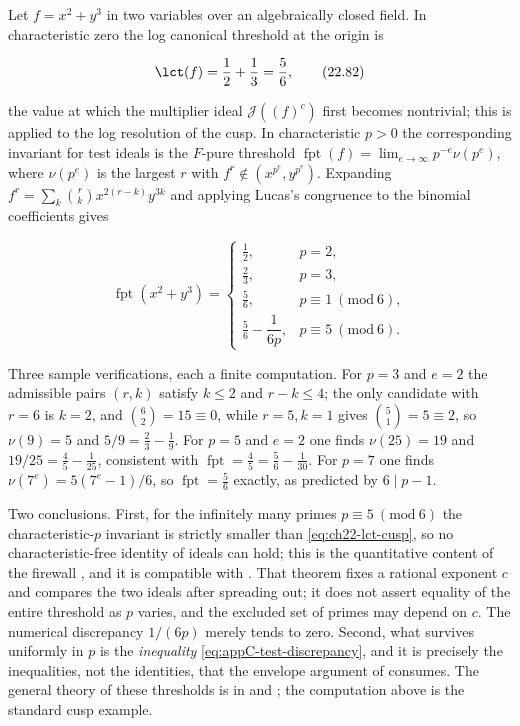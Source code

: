 \begin{example}
\label{ex:ch22-fpt-cusp}
Let $f=x^2+y^3$ in two variables over an algebraically closed field.  In
characteristic zero the log canonical threshold at the origin is

\[
 \lct(f)=\frac12+\frac13=\frac56 ,
\tag{22.82}\label{eq:ch22-lct-cusp}
\]

the value at which the multiplier ideal
$\mathcal J((f)^c)$ first becomes nontrivial; this is
 applied to the log resolution of the cusp.  In
characteristic $p>0$ the corresponding invariant for test ideals is the
$F$-pure threshold
$\operatorname{fpt}(f)=\lim_{e\to\infty}p^{-e}\nu(p^e)$, where
$\nu(p^e)$ is the largest $r$ with
$f^r\notin(x^{p^e},y^{p^e})$.  Expanding
$f^r=\sum_k\binom rkx^{2(r-k)}y^{3k}$ and applying Lucas's congruence to
the binomial coefficients gives

\[
 \operatorname{fpt}(x^2+y^3)=
 \begin{cases}
  \tfrac12,&p=2,\\[1mm]
  \tfrac23,&p=3,\\[1mm]
  \tfrac56,&p\equiv1\ (\mathrm{mod}\ 6),\\[1mm]
  \tfrac56-\dfrac1{6p},&p\equiv5\ (\mathrm{mod}\ 6).
 \end{cases}
\tag{22.83}\label{eq:ch22-fpt-cusp}
\]

Three sample verifications, each a finite computation.  For $p=3$ and
$e=2$ the admissible pairs $(r,k)$ satisfy $k\leq2$ and
$r-k\leq4$; the only candidate with $r=6$ is $k=2$, and
$\binom62=15\equiv0$, while $r=5,k=1$ gives $\binom51=5\equiv2$, so
$\nu(9)=5$ and $5/9=\tfrac23-\tfrac19$.  For $p=5$ and $e=2$ one
finds $\nu(25)=19$ and $19/25=\tfrac45-\tfrac1{25}$, consistent with
$\operatorname{fpt}=\tfrac45=\tfrac56-\tfrac1{30}$.  For $p=7$ one finds
$\nu(7^e)=5(7^e-1)/6$, so $\operatorname{fpt}=\tfrac56$ exactly, as
predicted by $6\mid p-1$.

Two conclusions.  First, for the infinitely many primes
$p\equiv5\ (\mathrm{mod}\ 6)$ the characteristic-$p$ invariant is
strictly smaller than \eqref{eq:ch22-lct-cusp}, so no characteristic-free
identity of ideals can hold; this is the quantitative content of the
firewall , and it is compatible
with .  That theorem fixes a rational exponent
$c$ and compares the two ideals after spreading out; it does not assert
equality of the entire threshold as $p$ varies, and the excluded set of
primes may depend on $c$.  The numerical discrepancy $1/(6p)$ merely
tends to zero.  Second, what survives uniformly in $p$
is the \emph{inequality} \eqref{eq:appC-test-discrepancy}, and it is
precisely the inequalities, not the identities, that the envelope argument
of \cite{GJKM19} consumes.  The general theory of these thresholds is in
\cite{HY03} and \cite{ST12}; the computation above is the standard cusp
example.
\end{example}

